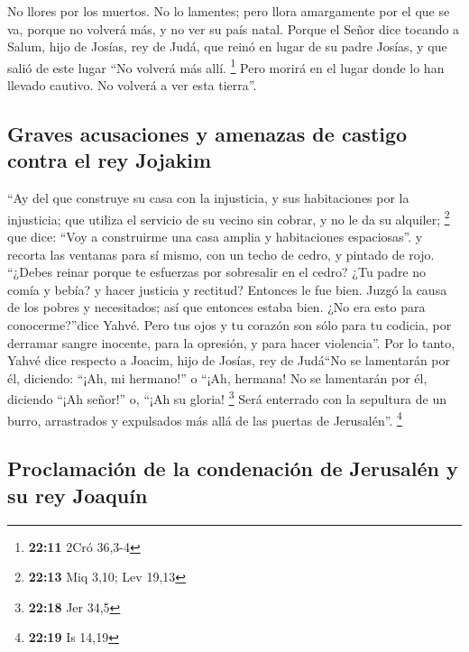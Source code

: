  No llores por los muertos. No lo lamentes; pero llora
amargamente por el que se va, porque no volverá más, y no ver su país
natal.  Porque el Señor dice tocando a Salum, hijo de
Josías, rey de Judá, que reinó en lugar de su padre Josías, y que salió
de este lugar ``No volverá más allí. \footnote{\textbf{22:11} 2Cró
  36,3-4}  Pero morirá en el lugar donde lo han llevado
cautivo. No volverá a ver esta tierra''.

\hypertarget{graves-acusaciones-y-amenazas-de-castigo-contra-el-rey-jojakim}{%
\subsection{Graves acusaciones y amenazas de castigo contra el rey
Jojakim}\label{graves-acusaciones-y-amenazas-de-castigo-contra-el-rey-jojakim}}

 ``Ay del que construye su casa con la injusticia, y sus
habitaciones por la injusticia; que utiliza el servicio de su vecino sin
cobrar, y no le da su alquiler; \footnote{\textbf{22:13} Miq 3,10; Lev
  19,13}  que dice: ``Voy a construirme una casa amplia y
habitaciones espaciosas''. y recorta las ventanas para sí mismo, con un
techo de cedro, y pintado de rojo.  ``¿Debes reinar
porque te esfuerzas por sobresalir en el cedro? ¿Tu padre no comía y
bebía? y hacer justicia y rectitud? Entonces le fue bien.
 Juzgó la causa de los pobres y necesitados; así que
entonces estaba bien. ¿No era esto para conocerme?''dice Yahvé.
 Pero tus ojos y tu corazón son sólo para tu codicia, por
derramar sangre inocente, para la opresión, y para hacer violencia''.
 Por lo tanto, Yahvé dice respecto a Joacim, hijo de
Josías, rey de Judá``No se lamentarán por él, diciendo: ``¡Ah, mi
hermano!'' o ``¡Ah, hermana! No se lamentarán por él, diciendo ``¡Ah
señor!'' o, ``¡Ah su gloria! \footnote{\textbf{22:18} Jer 34,5}
 Será enterrado con la sepultura de un burro, arrastrados
y expulsados más allá de las puertas de Jerusalén''. \footnote{\textbf{22:19}
  Is 14,19}

\hypertarget{proclamaciuxf3n-de-la-condenaciuxf3n-de-jerusaluxe9n-y-su-rey-joaquuxedn}{%
\subsection{Proclamación de la condenación de Jerusalén y su rey
Joaquín}\label{proclamaciuxf3n-de-la-condenaciuxf3n-de-jerusaluxe9n-y-su-rey-joaquuxedn}}


